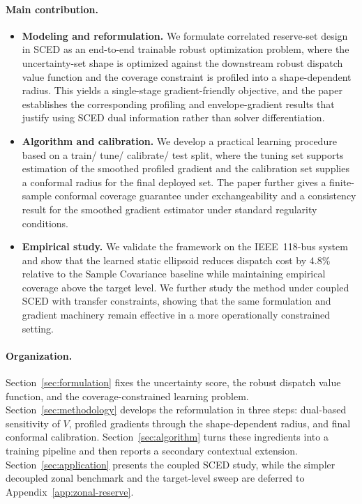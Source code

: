 \documentclass[11pt]{article}
\theoremstyle{definition}
\begin{document}
\paragraph{Main contribution.}
\begin{itemize}
\item \textbf{Modeling and reformulation.} We formulate correlated reserve-set design in SCED as an end-to-end trainable robust optimization problem, where the uncertainty-set shape is optimized against the downstream robust dispatch value function and the coverage constraint is profiled into a shape-dependent radius. This yields a single-stage gradient-friendly objective, and the paper establishes the corresponding profiling and envelope-gradient results that justify using SCED dual information rather than solver differentiation.

\item \textbf{Algorithm and calibration.} We develop a practical learning procedure based on a train/ tune/ calibrate/ test split, where the tuning set supports estimation of the smoothed profiled gradient and the calibration set supplies a conformal radius for the final deployed set. The paper further gives a finite-sample conformal coverage guarantee under exchangeability and a consistency result for the smoothed gradient estimator under standard regularity conditions.

\item \textbf{Empirical study.} We validate the framework on the IEEE~118-bus system and show that the learned static ellipsoid reduces dispatch cost by 4.8\% relative to the Sample Covariance baseline while maintaining empirical coverage above the target level. We further study the method under coupled SCED with transfer constraints, showing that the same formulation and gradient machinery remain effective in a more operationally constrained setting.
\end{itemize}

\paragraph{Organization.}
Section~\ref{sec:formulation} fixes the uncertainty score, the robust dispatch value function, and the coverage-constrained learning problem. Section~\ref{sec:methodology} develops the reformulation in three steps: dual-based sensitivity of $V$, profiled gradients through the shape-dependent radius, and final conformal calibration. Section~\ref{sec:algorithm} turns these ingredients into a training pipeline and then reports a secondary contextual extension. Section~\ref{sec:application} presents the coupled SCED study, while the simpler decoupled zonal benchmark and the target-level sweep are deferred to Appendix~\ref{app:zonal-reserve}.
\end{document}
